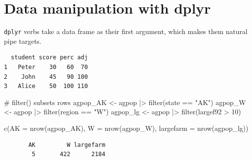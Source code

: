 \documentclass[
  letterpaper,
  DIV=11,
  numbers=noendperiod]{scrreprt}
\newenvironment{Shaded}{\begin{snugshade}}{\end{snugshade}}
\newcommand{\AttributeTok}[1]{\textcolor[rgb]{0.40,0.45,0.13}{#1}}
\newcommand{\CommentTok}[1]{\textcolor[rgb]{0.37,0.37,0.37}{#1}}
\newcommand{\DecValTok}[1]{\textcolor[rgb]{0.68,0.00,0.00}{#1}}
\newcommand{\FunctionTok}[1]{\textcolor[rgb]{0.28,0.35,0.67}{#1}}
\newcommand{\NormalTok}[1]{\textcolor[rgb]{0.00,0.23,0.31}{#1}}
\newcommand{\OtherTok}[1]{\textcolor[rgb]{0.00,0.23,0.31}{#1}}
\newcommand{\SpecialCharTok}[1]{\textcolor[rgb]{0.37,0.37,0.37}{#1}}
\newcommand{\StringTok}[1]{\textcolor[rgb]{0.13,0.47,0.30}{#1}}
\renewcommand{\[}{\begin{equation}}
\renewcommand{\]}{\end{equation}}
\begin{document}
\section{Data manipulation with
dplyr}\label{data-manipulation-with-dplyr}

\texttt{dplyr} verbs take a data frame as their first argument, which
makes them natural pipe targets.

\begin{Shaded}
\end{Shaded}

\begin{verbatim}
  student score perc adj
1   Peter    30   60  70
2    John    45   90 100
3   Alice    50  100 110
\end{verbatim}

\begin{Shaded}
\begin{Highlighting}[]
\CommentTok{\# filter() subsets rows}
\NormalTok{agpop\_AK }\OtherTok{\textless{}{-}}\NormalTok{ agpop }\SpecialCharTok{|\textgreater{}} \FunctionTok{filter}\NormalTok{(state }\SpecialCharTok{==} \StringTok{"AK"}\NormalTok{)}
\NormalTok{agpop\_W  }\OtherTok{\textless{}{-}}\NormalTok{ agpop }\SpecialCharTok{|\textgreater{}} \FunctionTok{filter}\NormalTok{(region }\SpecialCharTok{==} \StringTok{"W"}\NormalTok{)}
\NormalTok{agpop\_lg }\OtherTok{\textless{}{-}}\NormalTok{ agpop }\SpecialCharTok{|\textgreater{}} \FunctionTok{filter}\NormalTok{(largef92 }\SpecialCharTok{\textgreater{}} \DecValTok{10}\NormalTok{)}

\FunctionTok{c}\NormalTok{(}\AttributeTok{AK =} \FunctionTok{nrow}\NormalTok{(agpop\_AK), }\AttributeTok{W =} \FunctionTok{nrow}\NormalTok{(agpop\_W), }\AttributeTok{largefarm =} \FunctionTok{nrow}\NormalTok{(agpop\_lg))}
\end{Highlighting}
\end{Shaded}

\begin{verbatim}
       AK         W largefarm 
        5       422      2184 
\end{verbatim}
\end{document}
